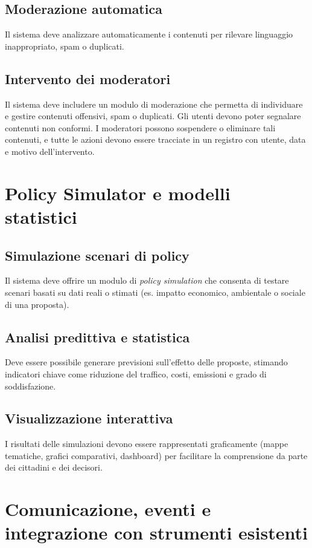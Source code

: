 \subsection{Moderazione automatica}
Il sistema deve analizzare automaticamente i contenuti per rilevare linguaggio inappropriato, spam o duplicati.

\subsection{Intervento dei moderatori}
Il sistema deve includere un modulo di moderazione che permetta di individuare e gestire contenuti offensivi, spam o duplicati.  
Gli utenti devono poter segnalare contenuti non conformi.  
I moderatori possono sospendere o eliminare tali contenuti, e tutte le azioni devono essere tracciate in un registro con utente, data e motivo dell’intervento.

\section{Policy Simulator e modelli statistici}

\subsection{Simulazione scenari di policy}
Il sistema deve offrire un modulo di \textit{policy simulation} che consenta di testare scenari basati su dati reali o stimati (es. impatto economico, ambientale o sociale di una proposta).

\subsection{Analisi predittiva e statistica}
Deve essere possibile generare previsioni sull’effetto delle proposte, stimando indicatori chiave come riduzione del traffico, costi, emissioni e grado di soddisfazione.

\subsection{Visualizzazione interattiva}
I risultati delle simulazioni devono essere rappresentati graficamente (mappe tematiche, grafici comparativi, dashboard) per facilitare la comprensione da parte dei cittadini e dei decisori.

\section{Comunicazione, eventi e integrazione con strumenti esistenti}

